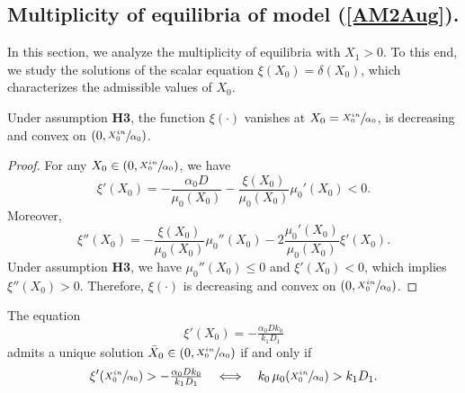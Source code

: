 \documentclass[runningheads]{llncs}
\begin{document}
\subsection{Multiplicity of equilibria of model (\ref{AM2Aug}).}    \label{SecAppBMult}
In this section, we analyze the multiplicity of equilibria with $X_1>0$.
To this end, we study the solutions of the scalar equation
$\xi(X_0)=\delta(X_0)$, which characterizes the admissible values of $X_0$.
\begin{lemma}                    \label{lemXi}
Under assumption {\bf H3}, the function $\xi(\cdot)$ vanishes at 
$X_0=\sfrac{X_0^{in}}{\alpha_0}$, is decreasing and convex on 
$\left(0,\sfrac{X_0^{in}}{\alpha_0}\right)$.
\end{lemma}
\begin{proof}
For any $X_0\in\left(0,\sfrac{X_0^{in}}{\alpha_0}\right)$, we have
\begin{equation}               \label{XiPrime}
\xi'(X_0)=-\frac{\alpha_0 D}{\mu_0(X_0)}-\frac{\xi(X_0)}{\mu_0(X_0)}\mu_0'(X_0)<0.
\end{equation}
Moreover,
\[
\xi''(X_0)=-\frac{\xi(X_0)}{\mu_0(X_0)}\mu_0''(X_0)-2\frac{\mu_0'(X_0)}{\mu_0(X_0)}\xi'(X_0).
\]
Under assumption {\bf H3}, we have $\mu_0''(X_0)\le 0$ and $\xi'(X_0)<0$,
which implies $\xi''(X_0)>0$. Therefore, $\xi(\cdot)$ is decreasing and convex on 
$\left(0,\sfrac{X_0^{in}}{\alpha_0}\right)$.
\end{proof}
\begin{lemma}                   \label{lemXi2}
The equation 
\begin{equation}            \label{EqXipEqRap}
\xi'(X_0)=-\tfrac{\alpha_0 D k_0}{k_1 D_1}
\end{equation}
admits a unique solution 
$\bar X_0 \in \left(0,\sfrac{X_0^{in}}{\alpha_0}\right)$
if and only if
\begin{equation}            \label{EquivXipMu0}
\xi'\!\left(\sfrac{X_0^{in}}{\alpha_0}\right) > -\tfrac{\alpha_0 D k_0}{k_1 D_1}
\quad \Longleftrightarrow \quad
k_0 \, \mu_0\!\left(\sfrac{X_0^{in}}{\alpha_0}\right) > k_1 D_1.
\end{equation}
\end{lemma}
\end{document}
